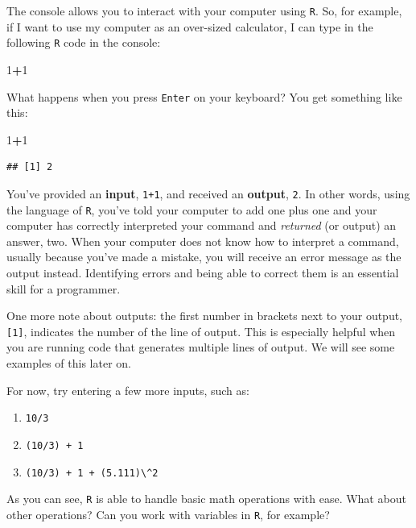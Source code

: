 \documentclass[
]{book}
\newenvironment{Shaded}{\begin{snugshade}}{\end{snugshade}}
\newcommand{\DecValTok}[1]{\textcolor[rgb]{0.00,0.00,0.81}{#1}}
\newcommand{\SpecialCharTok}[1]{\textcolor[rgb]{0.81,0.36,0.00}{\textbf{#1}}}
\begin{document}
The console allows you to interact with your computer using \texttt{R}. So, for example, if I want to use my computer as an over-sized calculator, I can type in the following \texttt{R} code in the console:

\begin{Shaded}
\begin{Highlighting}[]
\DecValTok{1}\SpecialCharTok{+}\DecValTok{1}
\end{Highlighting}
\end{Shaded}

What happens when you press \texttt{Enter} on your keyboard? You get something like this:

\begin{Shaded}
\begin{Highlighting}[]
\DecValTok{1}\SpecialCharTok{+}\DecValTok{1}
\end{Highlighting}
\end{Shaded}

\begin{verbatim}
## [1] 2
\end{verbatim}

You've provided an \textbf{input}, \texttt{1+1}, and received an \textbf{output}, \texttt{2}. In other words, using the language of \texttt{R}, you've told your computer to add one plus one and your computer has correctly interpreted your command and \emph{returned} (or output) an answer, two. When your computer does not know how to interpret a command, usually because you've made a mistake, you will receive an error message as the output instead. Identifying errors and being able to correct them is an essential skill for a programmer.

One more note about outputs: the first number in brackets next to your output, \texttt{{[}1{]}}, indicates the number of the line of output. This is especially helpful when you are running code that generates multiple lines of output. We will see some examples of this later on.

For now, try entering a few more inputs, such as:

\begin{enumerate}
\def\labelenumi{\arabic{enumi}.}
\item
  \texttt{10/3}
\item
  \texttt{(10/3)\ +\ 1}
\item
  \texttt{(10/3)\ +\ 1\ +\ (5.111)\textbackslash{}\^{}2}
\end{enumerate}

As you can see, \texttt{R} is able to handle basic math operations with ease. What about other operations? Can you work with variables in \texttt{R}, for example?
\end{document}
